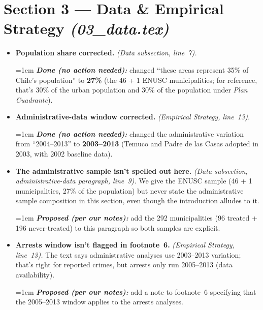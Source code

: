\documentclass[11pt]{article}
\newcommand{\where}[1]{{\small\textit{#1}}}
\newcommand{\fix}[1]{\smallskip\par\hangindent=1em \textbf{\itshape #1}}
\begin{document}
\section*{Section 3 --- Data \& Empirical Strategy \where{(03\_data.tex)}}
\begin{itemize}
\item \textbf{Population share corrected.} \where{(Data subsection, line~7).}
\fix{Done (no action needed):} changed ``these areas represent 35\% of Chile's population'' to \textbf{27\%} (the 46 + 1 ENUSC municipalities; for reference, that's 30\% of the urban population and 30\% of the population under \emph{Plan Cuadrante}).
\item \textbf{Administrative-data window corrected.} \where{(Empirical Strategy, line~13).}
\fix{Done (no action needed):} changed the administrative variation from ``2004--2013'' to \textbf{2003--2013} (Temuco and Padre de las Casas adopted in 2003, with 2002 baseline data).
\item \textbf{The administrative sample isn't spelled out here.} \where{(Data subsection, administrative-data paragraph, line~9).} We give the ENUSC sample (46 + 1 municipalities, 27\% of the population) but never state the administrative sample composition in this section, even though the introduction alludes to it.
\fix{Proposed (per our notes):} add the 292 municipalities (96 treated + 196 never-treated) to this paragraph so both samples are explicit.
\item \textbf{Arrests window isn't flagged in footnote~6.} \where{(Empirical Strategy, line~13).} The text says administrative analyses use 2003--2013 variation; that's right for reported crimes, but arrests only run 2005--2013 (data availability).
\fix{Proposed (per our notes):} add a note to footnote~6 specifying that the 2005--2013 window applies to the arrests analyses.
\end{itemize}
\end{document}

